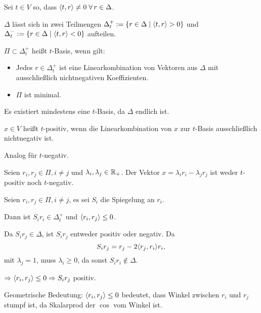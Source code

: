 \documentclass[12pt]{extarticle}
\begin{document}
\begin{defi}
    Sei \( t \in V \) so, dass \( \scalarprod{t}{r} \neq 0 
    \; \forall r \in \Delta \).

    \( \Delta \) lässt sich in zwei Teilmengen 
    \( \Delta_t^+ := 
    \{r \in \Delta \;\vert \; \langle t, r \rangle > 0\} \) 
    und \( \Delta_t^- := 
    \{r \in \Delta \;\vert \; \langle t, r \rangle < 0\} \) 
    aufteilen. 
\end{defi}

\begin{defi}[\( t \)-Basis]
    \( \Pi \subset \Delta_t^+ \) heißt \( t \)-Basis, 
    wenn gilt:
    \begin{itemize}
        \item Jedes \( r \in \Delta_t^+ \) ist 
        eine Linearkombination von Vektoren aus 
        \( \Delta \) mit ausschließlich 
        nichtnegativen Koeffizienten.
        \item \( \Pi \) ist minimal.
    \end{itemize}
    Es existiert mindestens eine \( t \)-Basis, 
    da \( \Delta \) endlich ist.
\end{defi}

\begin{defi}[\( t \)-positiv]
    \( x \in V \) heißt \(t\)-positiv, wenn 
    die Linearkombination von \(x\) zur 
    \(t\)-Basis ausschließlich nichtnegativ ist.

    Analog für \( t \)-negativ.
\end{defi}

\begin{satz} %
    Seien \( r_i, r_j \in \Pi, i \neq j \) und 
    \( \lambda_i, \lambda_j \in \mathbb{R}_+ \). 
    Der Vektor \( x = \lambda_i r_i - \lambda_j r_j \) 
    ist weder \( t \)-positiv noch \( t \)-negativ.
\end{satz}

\begin{satz} %
    Seien \( r_i, r_j \in \Pi, i \neq j \), es 
    sei \( S_i \) die Spiegelung an \( r_i \). 

    Dann ist \( S_i r_i \in \Delta_t^+ \) und 
    \( \langle r_i, r_j \rangle \leq 0 \).
\end{satz}
\begin{bew}
    Da \( S_i r_j \in \Delta \), ist \( S_i r_j \) 
    entweder positiv oder negativ. Da 
    \[ S_i r_j = r_j - 2 \langle r_j, r_i \rangle r_i, \]
    mit \( \lambda_j = 1 \), muss 
    \( \lambda_i \geq 0 \), da sonst 
    \( S_i r_i \notin \Delta \). 

    \( \Rightarrow \langle r_i, r_j \rangle \leq 0 
    \Rightarrow S_i r_j \) 
    positiv.
\end{bew}
\begin{bem}
    Geometrische Bedeutung:
    \( \langle r_i, r_j \rangle \leq 0 \) bedeutet, 
    dass Winkel zwischen \(r_i\) und \(r_j\) 
    stumpf ist, da Skalarprod der \( \cos \) 
    vom Winkel ist.
\end{bem}
\end{document}
